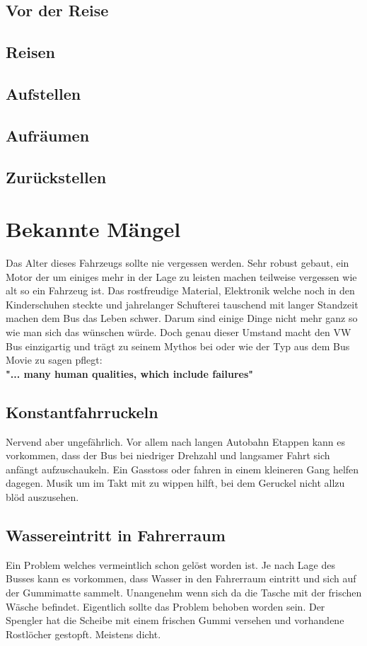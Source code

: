 \subsection{Vor der Reise}
\subsection{Reisen}
\subsection{Aufstellen}
\subsection{Aufräumen}
\subsection{Zurückstellen}
\newpage
\section{Bekannte Mängel}
Das Alter dieses Fahrzeugs sollte nie vergessen werden. Sehr robust gebaut, ein Motor der um einiges mehr in der Lage zu leisten machen teilweise vergessen wie alt so ein Fahrzeug ist.
Das rostfreudige Material, Elektronik welche noch in den Kinderschuhen steckte und jahrelanger Schufterei tauschend mit langer Standzeit machen dem Bus das Leben schwer. 
Darum sind einige Dinge nicht mehr ganz so wie man sich das wünschen würde.
Doch genau dieser Umstand macht den VW Bus einzigartig und trägt zu seinem Mythos bei oder wie der Typ aus dem Bus Movie zu sagen pflegt:\\ \textbf{"... many human qualities, which include failures"}

\subsection{Konstantfahrruckeln}
Nervend aber ungefährlich.
Vor allem nach langen Autobahn Etappen kann es vorkommen, dass der Bus bei niedriger Drehzahl und langsamer Fahrt sich anfängt aufzuschaukeln.
Ein Gasstoss oder fahren in einem kleineren Gang helfen dagegen. Musik um im Takt mit zu wippen hilft, bei dem Geruckel nicht allzu blöd auszusehen.

\subsection{Wassereintritt in Fahrerraum}
Ein Problem welches vermeintlich schon gelöst worden ist. Je nach Lage des Busses kann es vorkommen, dass Wasser in den Fahrerraum eintritt und sich auf der Gummimatte sammelt. 
Unangenehm wenn sich da die Tasche mit der frischen Wäsche befindet. 
Eigentlich sollte das Problem behoben worden sein. 
Der Spengler hat die Scheibe mit einem frischen Gummi versehen und vorhandene Rostlöcher gestopft.
Meistens dicht.

